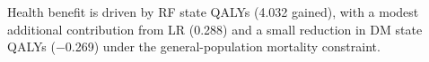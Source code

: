 Health benefit is driven by RF state QALYs (4.032 gained), with a modest additional contribution from LR (0.288) and a small reduction in DM state QALYs ($-$0.269) under the general-population mortality constraint.
